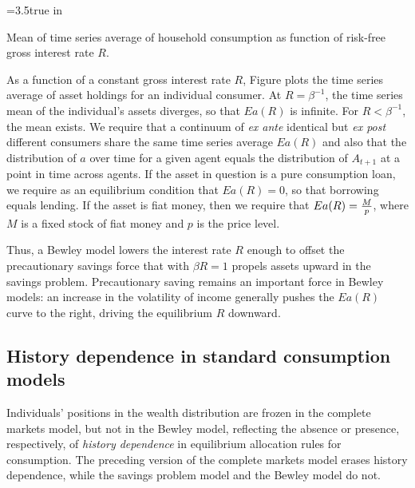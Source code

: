 \centerline{\epsfxsize=3.5true in}
\caption{Mean of time series average of household consumption
as function of risk-free gross interest rate $R$.}
\endfigure

As a function of a constant gross interest rate $R$,
Figure 
plots the time series average of asset holdings for an
individual consumer.  At $R=\beta^{-1}$, the time series mean
of the individual's assets diverges, so that $E a(R)$ is infinite.
 For $R < \beta^{-1}$, the mean exists.  We require that a continuum
of {\it ex ante\/} identical but {\it ex post\/}
 different consumers share the same
time series average $E a(R)$ and also that the distribution of
$a$ over time for a given agent equals the distribution of $A_{t+1}$ at a point in time across
agents.  If the
asset in question is a pure consumption loan, we require
as an equilibrium condition that $E a(R) =0$, so that
borrowing equals lending. If the asset is fiat money, then
we require that $E a(R) = {M \over p}$, where $M$ is a fixed stock of fiat
money and $p$ is the price level.

Thus, a Bewley model lowers the interest rate $R$
enough to offset the precautionary savings force that with $\beta R=1$ propels
assets upward
in the savings problem.
  Precautionary saving remains an important force in Bewley
models: an increase in the volatility of income generally pushes
the $E a(R)$ curve to the right, driving the equilibrium $R$ downward.






\subsection{History dependence in standard consumption models}

Individuals' positions in the wealth distribution
are frozen in  the complete markets model,    but not
in the Bewley model, reflecting the absence or presence, respectively,
 of {\it history dependence\/} in
 equilibrium allocation rules for consumption.
   The preceding version of the complete markets model
erases history dependence, while the savings problem model and the
Bewley model do not.


